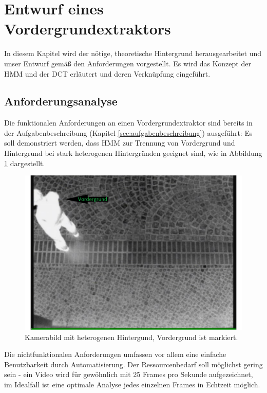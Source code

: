 \section{Entwurf eines Vordergrundextraktors}
\label{chap:entwurf}

In diesem Kapitel wird der nötige, theoretische Hintergrund herausgearbeitet und unser Entwurf gemäß den Anforderungen vorgestellt.
Es wird das Konzept der HMM und der DCT erläutert und deren Verknüpfung eingeführt.


\subsection{Anforderungsanalyse}
\label{sec:anforderungsanalyse}

Die funktionalen Anforderungen an einen Vordergrundextraktor sind bereits in der Aufgabenbeschreibung (Kapitel \ref{sec:aufgabenbeschreibung}) ausgeführt:
Es soll demonstriert werden, dass HMM zur Trennung von Vordergrund und Hintergrund bei stark heterogenen Hintergründen geeignet sind, wie in Abbildung \ref{fig:foreground} dargestellt.
\begin{figure}[H]
	\centering
	\includegraphics[width=1\textwidth]{bilder/01_foreground.pdf}
	\caption{Kamerabild mit heterogenen Hintergund, Vordergrund ist markiert.}
	\label{fig:foreground}
\end{figure}
Die nichtfunktionalen Anforderungen umfassen vor allem eine einfache Benutzbarkeit durch Automatisierung.
Der Ressourcenbedarf soll möglichst gering sein - ein Video wird für gewöhnlich mit 25 Frames pro Sekunde aufgezeichnet, im Idealfall ist eine optimale Analyse jedes einzelnen Frames in Echtzeit möglich.
